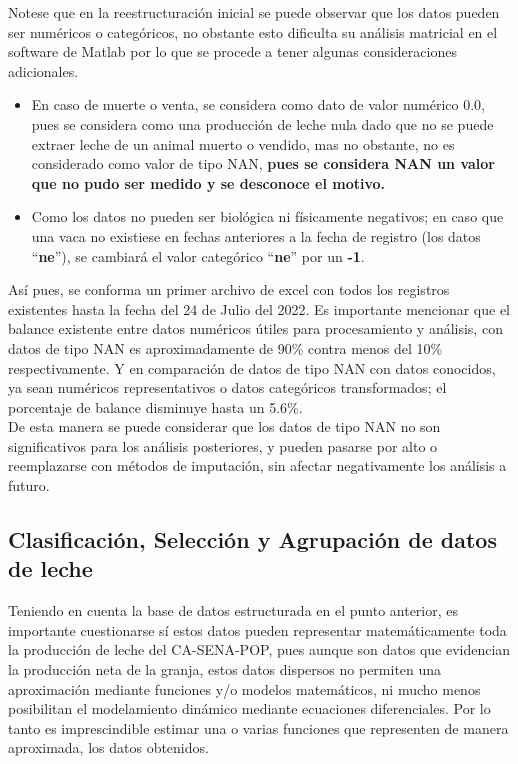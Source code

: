 Notese que en la reestructuración inicial se puede observar que los datos pueden ser numéricos o categóricos, no obstante esto dificulta su análisis matricial en el software de Matlab por lo que se procede a tener algunas consideraciones adicionales.

\begin{itemize}
    \item En caso de muerte o venta, se considera como dato de valor numérico 0.0, pues se considera como una producción de leche nula dado que no se puede extraer leche de un animal muerto o vendido, mas no obstante, no es considerado como valor de tipo NAN, \textbf{pues se considera NAN un valor que no pudo ser medido y se desconoce el motivo.}
    \item Como los datos no pueden ser biológica ni físicamente negativos; en caso que una vaca no existiese en fechas anteriores a la fecha de registro (los datos ``\textbf{ne}''), se cambiará el valor categórico ``\textbf{ne}'' por un \textbf{-1}.
\end{itemize}


Así pues, se conforma un primer archivo de excel con todos los registros existentes hasta la fecha del 24 de Julio del 2022. Es importante mencionar que el balance existente entre datos numéricos útiles para procesamiento y análisis, con datos de tipo NAN es  aproximadamente de 90\% contra menos del 10\% respectivamente. Y en comparación de datos de tipo NAN con datos conocidos, ya sean numéricos representativos o datos categóricos transformados; el porcentaje de balance disminuye hasta un 5.6\%.\\

De esta manera se puede considerar que los datos de tipo NAN no son significativos para los análisis posteriores, y pueden pasarse por alto o reemplazarse con métodos de imputación, sin afectar negativamente los análisis a futuro.

\pagebreak

\subsection{Clasificación, Selección y Agrupación de datos de leche}
Teniendo en cuenta la base de datos estructurada en el punto anterior, es importante cuestionarse sí estos datos pueden representar matemáticamente toda la producción de leche del CA-SENA-POP, pues aunque son datos que evidencian la producción neta de la granja, estos datos dispersos no permiten una aproximación mediante funciones y/o modelos matemáticos, ni mucho menos posibilitan el modelamiento dinámico mediante ecuaciones diferenciales. Por lo tanto es imprescindible estimar una o varias funciones que representen de manera aproximada, los datos obtenidos.\\

